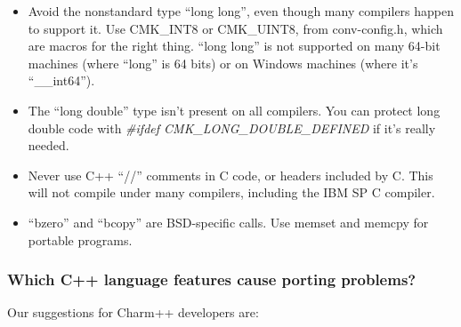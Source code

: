 \begin{itemize}
\item Avoid the nonstandard type ``long long'', even though many compilers
happen to support it.  Use CMK\_INT8 or CMK\_UINT8,
from conv-config.h, which are macros for the right thing.
``long long'' is not supported on many 64-bit machines (where ``long''
is 64 bits) or on Windows machines (where it's ``\_\_int64'').
\item The ``long double'' type isn't present on all compilers.  You can protect
long double code with {\em \#ifdef CMK\_LONG\_DOUBLE\_DEFINED} if it's really needed.
\item Never use C++ ``//'' comments in C code, or headers included by C.
This will not compile under many compilers, including the IBM SP C compiler.
\item ``bzero'' and ``bcopy'' are BSD-specific calls.  
Use memset and memcpy for portable programs.
\end{itemize}

\subsubsection{Which C++ language features cause porting problems?}

Our suggestions for Charm++ developers are:

